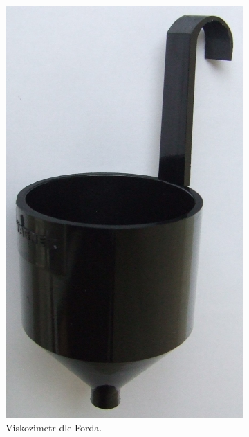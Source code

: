 \documentclass[12pt]{article}
\begin{document}
\begin{figure}
\begin{subfigure}[b]{.3\textwidth}
        \includegraphics[width = \linewidth]{figures/ford cup viscometer.jpg}
        \caption{Viskozimetr dle Forda.~\cite{Figure:ford_cup_viscometer}}
    \end{subfigure}
    \hfill
    \begin{subfigure}[b]{.3\textwidth}

\end{subfigure}
\end{figure}
\end{document}
